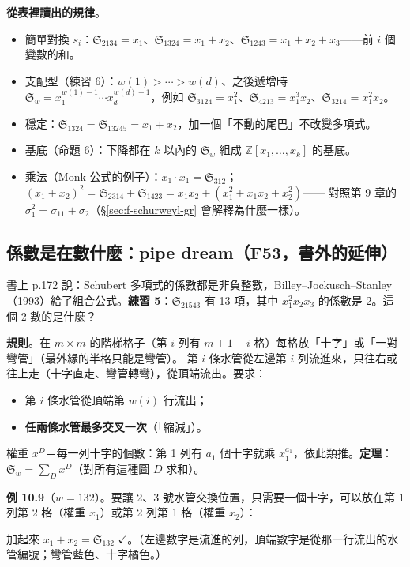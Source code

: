 \textbf{從表裡讀出的規律}。
\begin{itemize}[nosep]
\item 簡單對換 $s_i$：$\mathfrak S_{2134}=x_1$、$\mathfrak S_{1324}=x_1+x_2$、$\mathfrak S_{1243}=x_1+x_2+x_3$——前 $i$ 個變數的和。
\item 支配型（練習 6）：$w(1)>\cdots>w(d)$、之後遞增時 $\mathfrak S_w=x_1^{w(1)-1}\cdots x_d^{w(d)-1}$，例如 $\mathfrak S_{3124}=x_1^2$、$\mathfrak S_{4213}=x_1^3x_2$、$\mathfrak S_{3214}=x_1^2x_2$。
\item 穩定：$\mathfrak S_{1324}=\mathfrak S_{13245}=x_1+x_2$，加一個「不動的尾巴」不改變多項式。
\item 基底（命題 6）：下降都在 $k$ 以內的 $\mathfrak S_w$ 組成 $\mathbb Z[x_1,\dots,x_k]$ 的基底。
\item 乘法（Monk 公式的例子）：$x_1\cdot x_1=\mathfrak S_{312}$；$(x_1+x_2)^2=\mathfrak S_{2314}+\mathfrak S_{1423}=x_1x_2+(x_1^2+x_1x_2+x_2^2)$——
      對照第 9 章的 $\sigma_1^2=\sigma_{11}+\sigma_2$（\S\ref{sec:f-schurweyl-gr} 會解釋為什麼一樣）。
\end{itemize}

\subsection{係數是在數什麼：pipe dream（F53，書外的延伸）}\label{sec:f-pipes}

書上 p.172 說：Schubert 多項式的係數都是非負整數，Billey–Jockusch–Stanley（1993）給了組合公式。\textbf{練習 5}：$\mathfrak S_{21543}$ 有 13 項，其中 $x_1^2x_2x_3$ 的係數是 2。這個 2 數的是什麼？

\textbf{規則}。在 $m\times m$ 的階梯格子（第 $i$ 列有 $m+1-i$ 格）每格放「十字」或「一對彎管」（最外緣的半格只能是彎管）。
第 $i$ 條水管從左邊第 $i$ 列流進來，只往右或往上走（十字直走、彎管轉彎），從頂端流出。要求：
\begin{itemize}[nosep]
\item 第 $i$ 條水管從頂端第 $w(i)$ 行流出；
\item \textbf{任兩條水管最多交叉一次}（「縮減」）。
\end{itemize}
權重 $x^D$＝每一列十字的個數：第 1 列有 $a_1$ 個十字就乘 $x_1^{a_1}$，依此類推。\textbf{定理}：$\mathfrak S_w=\sum_Dx^D$（對所有這種圖 $D$ 求和）。

\textbf{例 10.9}（$w=132$）。要讓 2、3 號水管交換位置，只需要一個十字，可以放在第 1 列第 2 格（權重 $x_1$）或第 2 列第 1 格（權重 $x_2$）：
\begin{center}
\FulPipesOTT
\end{center}
加起來 $x_1+x_2=\mathfrak S_{132}$ $\checkmark$。（左邊數字是流進的列，頂端數字是從那一行流出的水管編號；彎管藍色、十字橘色。）

